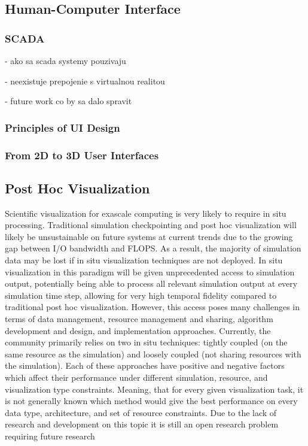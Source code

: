 \subsection{Human-Computer Interface}

\subsubsection{SCADA}

- ako sa scada systemy pouzivaju

- neexistuje prepojenie s virtualnou realitou

- future work co by sa dalo spravit

\subsubsection{Principles of UI Design}

\subsubsection{From 2D to 3D User Interfaces}

\subsection{Post Hoc Visualization}

Scientific visualization for exascale computing is very likely to require in situ processing. Traditional simulation checkpointing and post hoc visualization will likely be unsustainable on future systems at current trends due to the growing gap between I/O bandwidth and FLOPS. As a result, the majority of simulation data may be lost if in situ visualization techniques are not deployed. In situ visualization in this paradigm will be given unprecedented access to simulation output, potentially being able to process all relevant simulation output at every simulation time step, allowing for very high temporal fidelity compared to traditional post hoc visualization. However, this access poses many
challenges in terms of data management, resource management and sharing, algorithm development and design, and implementation approaches. Currently, the community primarily relies on two in situ techniques: tightly coupled (on the same resource
as the simulation) and loosely coupled (not sharing resources with the simulation). Each of these approaches have positive and negative factors which affect their performance under different simulation, resource, and visualization type constraints. Meaning, that for every given visualization task, it is not generally known which method would give the best performance on every data type, architecture, and set of resource constraints. Due to the
lack of research and development on this topic it is still an open research problem requiring future research
\cite{Kepler2017InSV}

